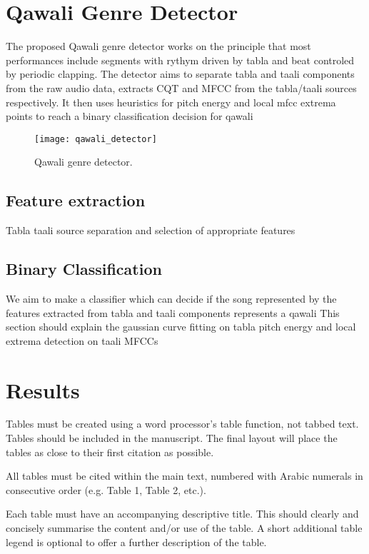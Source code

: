 \documentclass{article}
\begin{document}
\section{Qawali Genre Detector}\label{sec:detector}

The proposed Qawali genre detector works on the principle that most performances include segments with rythym driven by tabla and beat controled by periodic clapping. The detector aims to separate tabla and taali components from the raw audio data, extracts CQT and MFCC from the tabla/taali sources respectively. It then uses heuristics for pitch energy and local mfcc extrema points to reach a binary classification decision for qawali
\begin{figure}[htbp]
  \centering
  \texttt{[image: qawali\_detector]}
  \caption{Qawali genre detector.}
\label{fig:figure}
\end{figure}

\subsection{Feature extraction}
Tabla taali source separation and selection of appropriate features

\subsection{Binary Classification}
We aim to make a classifier which can decide if the song represented by the features extracted from tabla and taali components represents a qawali
This section should explain the gaussian curve fitting on tabla pitch energy and local extrema detection on taali MFCCs



\section{Results}\label{sec:result}

Tables must be created using a word processor's table function,
not tabbed text.
Tables should be included in the manuscript.
The final layout will place the tables as close to their first
citation as possible.

All tables must be cited within the main text, numbered with Arabic
numerals in consecutive order (e.g. Table 1, Table 2, etc.).

Each table must have an accompanying descriptive title.
This should clearly and concisely summarise the content and/or
use of the table.
A short additional table legend is optional to offer a further
description of the table.
\end{document}
